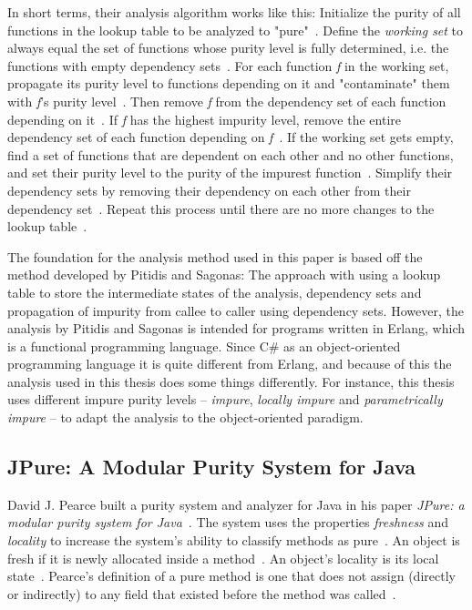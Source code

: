 \documentclass[a4paper,12pt]{article}
\begin{document}
In short terms, their analysis algorithm works like this: Initialize the purity of all functions in the lookup table to be analyzed to "pure"~\cite{pitidis2010purity}. Define the \textit{working set} to always equal the set of functions whose purity level is fully determined, i.e. the functions with empty dependency sets~\cite{pitidis2010purity}. For each function \textit{f} in the working set, propagate its purity level to functions depending on it and "contaminate" them with \textit{f}'s purity level~\cite{pitidis2010purity}. Then remove \textit{f} from the  dependency set of each function depending on it~\cite{pitidis2010purity}. If \textit{f} has the highest impurity level, remove the entire dependency set of each function depending on \textit{f}~\cite{pitidis2010purity}. If the working set gets empty, find a set of functions that are dependent on each other and no other functions, and set their purity level to the purity of the impurest function~\cite{pitidis2010purity}. Simplify their dependency sets by removing their dependency on each other from their dependency set~\cite{pitidis2010purity}. Repeat this process until there are no more changes to the lookup table~\cite{pitidis2010purity}.

The foundation for the analysis method used in this paper is based off the method developed by Pitidis and Sagonas: The approach with using a lookup table to store the intermediate states of the analysis, dependency sets and propagation of impurity from callee to caller using dependency sets. However, the analysis by Pitidis and Sagonas is intended for programs written in Erlang, which is a functional programming language.
Since C\# as an object-oriented programming language it is quite different from Erlang, and because of this the analysis used in this thesis does some things differently. For instance, this thesis uses different impure purity levels -- \textit{impure}, \textit{locally impure} and \textit{parametrically impure} -- to adapt the analysis to the object-oriented paradigm.

\subsection{JPure: A Modular Purity System for Java} \label{sub:JPure: A Modular Purity System for Java}

David J. Pearce built a purity system and analyzer for Java in his paper \textit{JPure: a modular purity system for Java}~\cite{pearce2011jpure}. The system uses the properties \textit{freshness} and \textit{locality} to increase the system's ability to classify methods as pure~\cite{pearce2011jpure}. An object is fresh if it is newly allocated inside a method~\cite{pearce2011jpure}. An object's locality is its local state~\cite{pearce2011jpure}. Pearce's definition of a pure method is one that does not assign (directly or indirectly) to any field that existed before the method was called~\cite{pearce2011jpure}.
\end{document}
